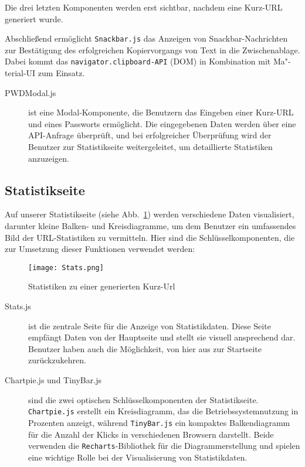 \documentclass[a4paper,11pt,DIV=12]{scrreprt}%
\begin{document}
Die drei letzten Komponenten werden erst sichtbar, nachdem eine Kurz-\ac{URL} generiert wurde.

Abschließend ermöglicht \texttt{Snackbar.js} das Anzeigen von Snackbar-Nachrichten zur Bestätigung des erfolgreichen Kopiervorgangs von Text in die Zwischenablage. Dabei kommt das \texttt{navigator.clipboard-API} (\ac{DOM}) in Kombination mit Ma"-terial-UI zum Einsatz.

\begin{description}
    \item[PWDModal.js] ist eine Modal-Komponente, die Benutzern das Eingeben einer Kurz-URL und eines Passworts ermöglicht. Die eingegebenen Daten werden über eine API-Anfrage überprüft, und bei erfolgreicher Überprüfung wird der Benutzer zur Statistikseite weitergeleitet, um detaillierte Statistiken anzuzeigen.
\end{description}
    
\subsection{Statistikseite}

Auf unserer Statistikseite (siehe Abb.~\ref{fig:Stats}) werden verschiedene Daten visualisiert, darunter kleine Balken- und Kreisdiagramme, um dem Benutzer ein umfassendes Bild der URL-Statistiken zu vermitteln. Hier sind die Schlüsselkomponenten, die zur Umsetzung dieser Funktionen verwendet werden:

\begin{figure}[h]%
    \begin{small}%
        \begin{center}%
            \texttt{[image: Stats.png]}%
        \end{center}%
        \caption{Statistiken zu einer generierten Kurz-Url}%
        \label{fig:Stats}%
    \end{small}%
\end{figure}%

\begin{description}
    \item[Stats.js] ist die zentrale Seite für die Anzeige von Statistikdaten. Diese Seite empfängt Daten von der Hauptseite und stellt sie visuell ansprechend dar. Benutzer haben auch die Möglichkeit, von hier aus zur Startseite zurückzukehren.
    
    \item [Chartpie.js und TinyBar.js] sind die zwei optischen Schlüsselkomponenten der Statistikseite. \texttt{Chartpie.js} erstellt ein Kreisdiagramm, das die Betriebssystemnutzung in Prozenten anzeigt, während \texttt{TinyBar.js} ein kompaktes Balkendiagramm für die Anzahl der Klicks in verschiedenen Browsern darstellt. Beide verwenden die \texttt{Recharts}-Bibliothek für die Diagrammerstellung und spielen eine wichtige Rolle bei der Visualisierung von Statistikdaten.
\end{description}
\end{document}

